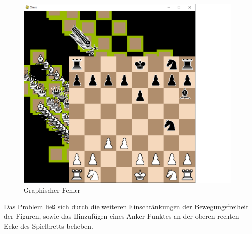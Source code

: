 \documentclass[a4paper, 10pt]{scrartcl}
\begin{document}
\begin{figure}[h]
        \centering
        \includegraphics[scale=0.35]{assets/tf_have_I_done.png}
        \caption{Graphischer Fehler}
\end{figure}

Das Problem ließ sich durch die weiteren Einschränkungen
der Bewegungsfreiheit der Figuren, sowie das Hinzufügen eines
Anker-Punktes an der oberen-rechten Ecke des Spielbretts beheben. 

\pagebreak
\end{document}
